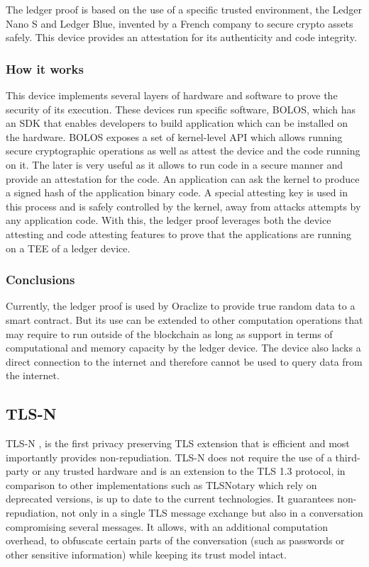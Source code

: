 The ledger proof is based on the use of a specific trusted environment, the Ledger Nano S and Ledger Blue, invented by a French company to secure crypto assets safely. This device provides an attestation for its authenticity and code integrity.

\subsubsection{How it works}

This device implements several layers of hardware and software to prove the security of its execution. These devices run specific software, BOLOS, which has an SDK that enables developers to build application which can be installed on the hardware. BOLOS exposes a set of kernel-level API which allows running secure cryptographic operations as well as attest the device and the code running on it. The later is very useful as it allows to run code in a secure manner and provide an attestation for the code. An application can ask the kernel to produce a signed hash of the application binary code. A special attesting key is used in this process and is safely controlled by the kernel, away from attacks attempts by any application code. With this, the ledger proof leverages both the device attesting and code attesting features to prove that the applications are running on a TEE of a ledger device.

\subsubsection{Conclusions}

Currently, the ledger proof is used by Oraclize to provide true random data to a smart contract. But its use can be extended to other computation operations that may require to run outside of the blockchain as long as support in terms of computational and memory capacity by the ledger device. The device also lacks a direct connection to the internet and therefore cannot be used to query data from the internet.


\subsection{TLS-N}
TLS-N \cite{Ritzdorf2017}, is the first privacy preserving TLS extension that is efficient and most importantly provides non-repudiation. TLS-N does not require the use of a third-party or any trusted hardware and is an extension to the TLS 1.3 protocol, in comparison to other implementations such as TLSNotary which rely on deprecated versions, is up to date to the current technologies.
It guarantees non-repudiation, not only in a single TLS message exchange but also in a conversation compromising several messages. It allows, with an additional computation overhead, to obfuscate certain parts of the conversation (such as passwords or other sensitive information) while keeping its trust model intact.


